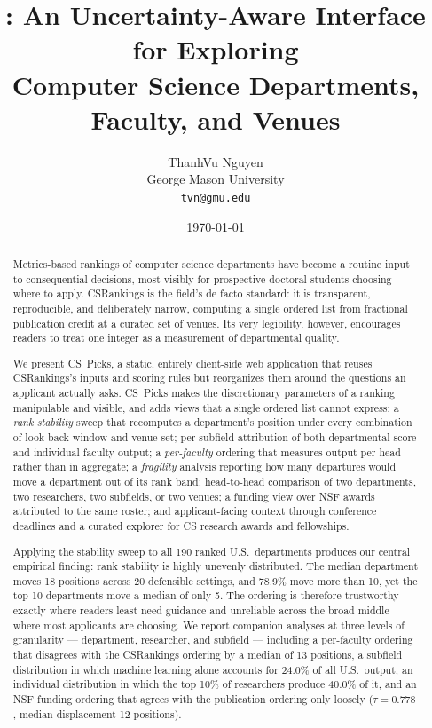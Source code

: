 \documentclass[11pt]{article}
\title{\sys: An Uncertainty-Aware Interface for Exploring\\
Computer Science Departments, Faculty, and Venues}
\author{ThanhVu Nguyen\\
George Mason University\\
\texttt{tvn@gmu.edu}}
\date{\today}
\newcommand{\sys}{CS~Picks}
\newcommand{\csr}{CSRankings}
\begin{document}
\maketitle

\begin{abstract}
Metrics-based rankings of computer science departments have become a routine
input to consequential decisions, most visibly for prospective doctoral
students choosing where to apply. \csr{} is the field's de facto standard: it
is transparent, reproducible, and deliberately narrow, computing a single
ordered list from fractional publication credit at a curated set of venues.
Its very legibility, however, encourages readers to treat one integer as a
measurement of departmental quality.

We present \sys{}, a static, entirely client-side web application that reuses
\csr{}'s inputs and scoring rules but reorganizes them around the questions an
applicant actually asks. \sys{} makes the discretionary parameters of a ranking
manipulable and visible, and adds views that a single ordered list cannot
express: a \emph{rank stability} sweep that recomputes a department's position
under every combination of look-back window and venue set; per-subfield
attribution of both departmental score and individual faculty output; a
\emph{per-faculty} ordering that measures output per head rather than in
aggregate; a \emph{fragility} analysis reporting how many departures would move
a department out of its rank band; head-to-head comparison of two departments,
two researchers, two subfields, or two venues; a funding view over NSF awards
attributed to the same roster; and applicant-facing context through conference
deadlines and a curated explorer for CS research awards and fellowships.

Applying the stability sweep to all 190 ranked U.S.\ departments produces our
central empirical finding: rank stability is highly unevenly distributed. The
median department moves 18 positions across 20 defensible settings, and 78.9\%
move more than 10, yet the top-10 departments move a median of only 5. The
ordering is therefore trustworthy exactly where readers least need guidance and
unreliable across the broad middle where most applicants are choosing. We
report companion analyses at three levels of granularity --- department,
researcher, and subfield --- including a per-faculty ordering that disagrees
with the \csr{} ordering by a median of 13 positions, a subfield distribution
in which machine learning alone accounts for 24.0\% of all U.S.\ output, an
individual distribution in which the top 10\% of researchers produce 40.0\% of
it, and an NSF funding ordering that agrees with the publication ordering only
loosely ($\tau = 0.778$, median displacement 12 positions).
\end{abstract}
\end{document}
